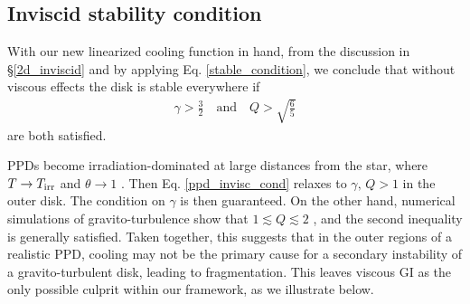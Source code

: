 
\subsection{Inviscid stability condition}
With our new linearized cooling function in hand, from the discussion
in \S\ref{2d_inviscid} and by applying 
Eq. \ref{stable_condition},  we conclude that without viscous effects 
the disk is stable everywhere if  
\begin{align} 
  \gamma > \frac{3}{2} \quad \text{and} \quad Q >
  \sqrt{\frac{6}{5}} \label{ppd_invisc_cond} 
\end{align} 
are both satisfied.  

PPDs become irradiation-dominated at large distances from the star,
where $T\to T_\mathrm{irr}$ and $\theta\to 1$ \citep{dalessio97,kratter11}.
Then Eq. \ref{ppd_invisc_cond} relaxes to 
$\gamma,\, Q > 1$ in the outer disk. The condition on $\gamma$
is then guaranteed. On the other hand, numerical 
simulations of gravito-turbulence show that $1\lesssim Q \lesssim 2$
\citep{gammie01,rice11}, and the second inequality is generally
satisfied.   
Taken together, this suggests that in the outer regions of a realistic
PPD, cooling %
may not be the primary cause for a secondary 
instability of a gravito-turbulent disk, leading to
fragmentation. This leaves viscous GI as the only possible culprit
within our framework, as we illustrate below.  

